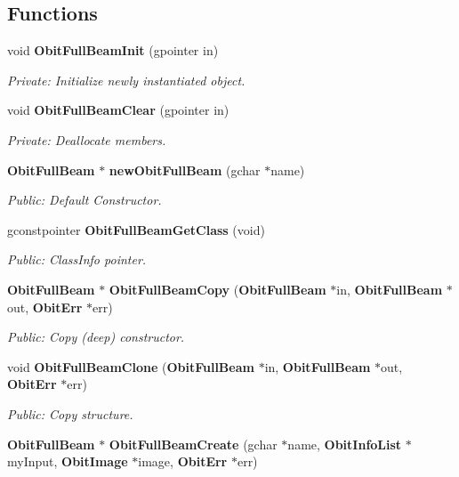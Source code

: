 \subsection*{Functions}
\begin{CompactItemize}
\item 
void {\bf Obit\-Full\-Beam\-Init} (gpointer in)
\begin{CompactList}\small\item\em Private: Initialize newly instantiated object. \item\end{CompactList}\item 
void {\bf Obit\-Full\-Beam\-Clear} (gpointer in)
\begin{CompactList}\small\item\em Private: Deallocate members. \item\end{CompactList}\item 
{\bf Obit\-Full\-Beam} $\ast$ {\bf new\-Obit\-Full\-Beam} (gchar $\ast$name)
\begin{CompactList}\small\item\em Public: Default Constructor. \item\end{CompactList}\item 
gconstpointer {\bf Obit\-Full\-Beam\-Get\-Class} (void)
\begin{CompactList}\small\item\em Public: Class\-Info pointer. \item\end{CompactList}\item 
{\bf Obit\-Full\-Beam} $\ast$ {\bf Obit\-Full\-Beam\-Copy} ({\bf Obit\-Full\-Beam} $\ast$in, {\bf Obit\-Full\-Beam} $\ast$out, {\bf Obit\-Err} $\ast$err)
\begin{CompactList}\small\item\em Public: Copy (deep) constructor. \item\end{CompactList}\item 
void {\bf Obit\-Full\-Beam\-Clone} ({\bf Obit\-Full\-Beam} $\ast$in, {\bf Obit\-Full\-Beam} $\ast$out, {\bf Obit\-Err} $\ast$err)
\begin{CompactList}\small\item\em Public: Copy structure. \item\end{CompactList}\item 
{\bf Obit\-Full\-Beam} $\ast$ {\bf Obit\-Full\-Beam\-Create} (gchar $\ast$name, {\bf Obit\-Info\-List} $\ast$my\-Input, {\bf Obit\-Image} $\ast$image, {\bf Obit\-Err} $\ast$err)

\end{CompactItemize}
